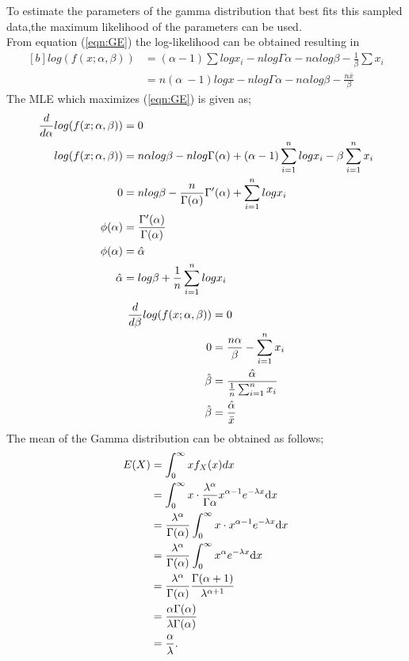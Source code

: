 To estimate the parameters of the gamma distribution that best fits this sampled data,the maximum likelihood of the parameters can be used.\\
From equation (\ref{eqn:GE}) the log-likelihood can be obtained resulting in
\begin{equation}
	\begin{aligned}[b]
		log(f(x;\alpha,\beta)) &= (\alpha-1)\sum log x_{i} - n log \Gamma\alpha - n \alpha log \beta - \frac{1}{\beta} \sum x_{i}\\ & = n(\alpha\ - 1) log x - nlog \Gamma\alpha - n \alpha log \beta - \frac{n \bar{x}}{\beta}
	\end{aligned}	
\end{equation}
The MLE which maximizes (\ref{eqn:GE}) is given as;
\begin{equation}
	\centering
\begin{aligned}[b]
	\frac{d}{d \alpha} log(f(x;\alpha,\beta)) & =  0 \\
	log(f(x;\alpha,\beta)) & = n\alpha log \beta - n log \Gamma (\alpha) + (\alpha - 1) \sum_{i=1}^{n} log x_{i} -\beta \sum_{i=1}^{n} x_{i}\\
	0 & = nlog\beta - \frac{n}{\Gamma (\alpha)} \Gamma^{\prime} (\alpha) + \sum_{i=1}^{n} log x_{i} \\
	\phi(\alpha) & =  \frac{\Gamma^{\prime}(\alpha)}{\Gamma(\alpha)}\\
	\phi(\alpha) & =  \hat{\alpha}\\
	\hat{\alpha} & =  log\beta + \frac{1}{n} \sum_{i=1}^{n} log x_{i}
\end{aligned}
\end{equation}
\begin{equation}
\centering
\begin{aligned}[b]
	\frac{d}{d \beta} log(f(x;\alpha,\beta)) & =  0 \\
	0 & = \frac{n \alpha}{\beta} - \sum_{i=1}^{n} x_{i}\\
	\hat{\beta} & = \frac{\hat{\alpha}}{\frac{1}{n}\sum_{i=1}^{n} x_{i}}\\
	\hat{\beta} & = \frac{\hat{\alpha}}{\bar{x}}
\end{aligned}	
\end{equation}
The mean of the Gamma distribution can be obtained as follows;
\begin{equation}
	\centering
\begin{aligned}[b]
	\centering
	E(X) &= \int_0^\infty x f_X(x) dx \\
	&= \int_0^\infty x \cdot \frac{\lambda^{\alpha}}{\Gamma{\alpha}} x^{\alpha - 1} e^{-\lambda x} {\rm d}x \\
	&= \frac{\lambda^{\alpha}}{\Gamma(\alpha)} \int_0^{\infty} x \cdot x^{\alpha - 1} e^{-\lambda x} {\rm d}x \\
	&= \frac{\lambda^{\alpha}}{\Gamma(\alpha)} \int_0^{\infty} x^{\alpha} e^{-\lambda x} {\rm d}x \\
	&= \frac{\lambda^{\alpha}}{\Gamma(\alpha)} \frac{\Gamma(\alpha + 1)}{\lambda^{\alpha + 1}}	\\
	&= \frac{\alpha\Gamma(\alpha)}{\lambda\Gamma(\alpha)}	\\
	&= \frac{\alpha}{\lambda}.
\end{aligned}
\end{equation}

